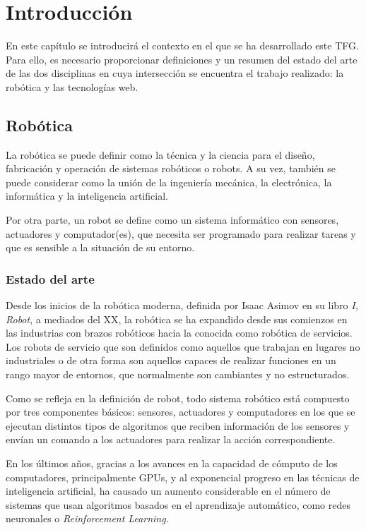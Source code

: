 \chapter{Introducción}\label{cap:introduccion}

En este capítulo se introducirá el contexto en el que se ha desarrollado este TFG. Para ello, es necesario proporcionar definiciones y un resumen del estado del arte de las dos disciplinas en cuya intersección se encuentra el trabajo realizado: la robótica y las tecnologías web. 

\section{Robótica}

La robótica se puede definir como la técnica y la ciencia para el diseño, fabricación y operación de sistemas robóticos o robots. A su vez, también se puede considerar como la unión de la ingeniería mecánica, la electrónica, la informática y la inteligencia artificial.

Por otra parte, un robot se define como un sistema informático con sensores, actuadores y computador(es), que necesita ser programado para realizar tareas y que es sensible a la situación de su entorno.

\subsection{Estado del arte}

Desde los inicios de la robótica moderna, definida por Isaac Asimov en su libro \textit{I, Robot}, a mediados del XX, la robótica se ha expandido desde sus comienzos en las industrias con brazos robóticos hacia la conocida como robótica de servicios. Los robots de servicio que son definidos como aquellos que trabajan en lugares no industriales o de otra forma son aquellos capaces de realizar funciones en un rango mayor de entornos, que normalmente son cambiantes y no estructurados. 

Como se refleja en la definición de robot, todo sistema robótico está compuesto por tres componentes básicos: sensores, actuadores y computadores en los que se ejecutan distintos tipos de algoritmos que reciben información de los sensores y envían un comando a los actuadores para realizar la acción correspondiente.

En los últimos años, gracias a los avances en la capacidad de cómputo de los computadores, principalmente GPUs, y al exponencial progreso en las técnicas de inteligencia artificial, ha causado un aumento considerable en el número de sistemas que usan algoritmos basados en el aprendizaje automático, como redes neuronales o \textit{Reinforcement Learning}.

